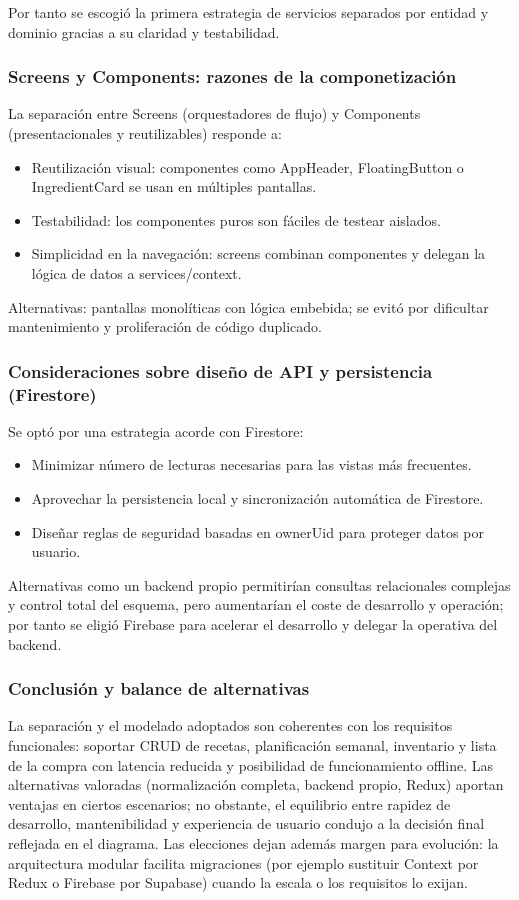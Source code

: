 \documentclass[twoside, openright, 11pt]{report}
\begin{document}
				Por tanto se escogió la primera estrategia de servicios separados por entidad y dominio gracias a su claridad y testabilidad.
			
			\subsubsection{Screens y Components: razones de la componetización}
				La separación entre Screens (orquestadores de flujo) y Components (presentacionales y reutilizables) responde a:
				\begin{itemize}
					\item Reutilización visual: componentes como AppHeader, FloatingButton o IngredientCard se usan en múltiples pantallas.
					\item Testabilidad: los componentes puros son fáciles de testear aislados.
					\item Simplicidad en la navegación: screens combinan componentes y delegan la lógica de datos a services/context.
				\end{itemize}
				Alternativas: pantallas monolíticas con lógica embebida; se evitó por dificultar mantenimiento y proliferación de código duplicado.
			
			\subsubsection{Consideraciones sobre diseño de API y persistencia (Firestore)}
				Se optó por una estrategia acorde con Firestore:
				\begin{itemize}
					\item Minimizar número de lecturas necesarias para las vistas más frecuentes.
					\item Aprovechar la persistencia local y sincronización automática de Firestore.
					\item Diseñar reglas de seguridad basadas en ownerUid para proteger datos por usuario.
				\end{itemize}
				Alternativas como un backend propio permitirían consultas relacionales complejas y control total del esquema, pero aumentarían el coste de desarrollo y operación; por tanto se eligió Firebase para acelerar el desarrollo y delegar la operativa del backend.
			
			\subsubsection{Conclusión y balance de alternativas}
				La separación y el modelado adoptados son coherentes con los requisitos funcionales: soportar CRUD de recetas, planificación semanal, inventario y lista de la compra con latencia reducida y posibilidad de funcionamiento offline. Las alternativas valoradas (normalización completa, backend propio, Redux) aportan ventajas en ciertos escenarios; no obstante, el equilibrio entre rapidez de desarrollo, mantenibilidad y experiencia de usuario condujo a la decisión final reflejada en el diagrama. Las elecciones dejan además margen para evolución: la arquitectura modular facilita migraciones (por ejemplo sustituir Context por Redux o Firebase por Supabase) cuando la escala o los requisitos lo exijan.
			
\end{document}
